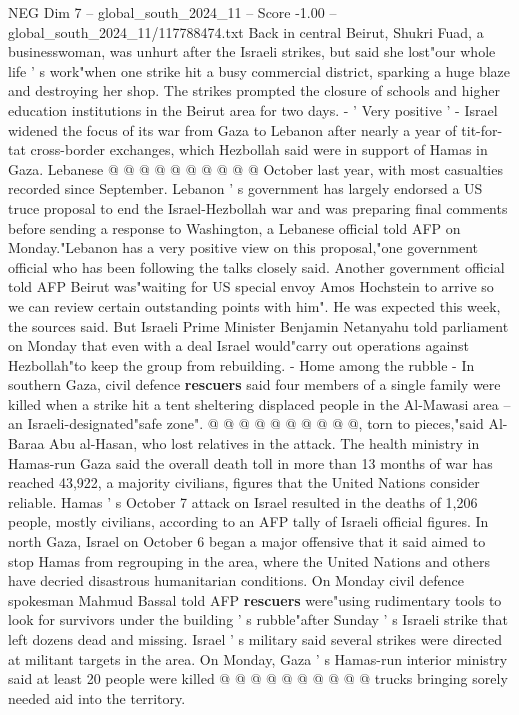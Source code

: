 \begin{textsample}{NEG Dim 7 – global\_south\_2024\_11 – Score -1.00 – global\_south\_2024\_11/117788474.txt}
Back in central Beirut, Shukri Fuad, a businesswoman, was unhurt after the Israeli strikes, but said she lost"our whole life ' s work"when one strike hit a busy commercial district, sparking a huge blaze and destroying her shop.
The strikes prompted the closure of schools and higher education institutions in the Beirut area for two days. - ' Very positive ' - Israel widened the focus of its war from Gaza to Lebanon after nearly a year of tit-for-tat cross-border exchanges, which Hezbollah said were in support of Hamas in Gaza.
Lebanese @ @ @ @ @ @ @ @ @ @ October last year, with most casualties recorded since September.
Lebanon ' s government has largely endorsed a US truce proposal to end the Israel-Hezbollah war and was preparing final comments before sending a response to Washington, a Lebanese official told AFP on Monday."Lebanon has a very positive view on this proposal,"one government official who has been following the talks closely said.
Another government official told AFP Beirut was"waiting for US special envoy Amos Hochstein to arrive so we can review certain outstanding points with him".
He was expected this week, the sources said.
But Israeli Prime Minister Benjamin Netanyahu told parliament on Monday that even with a deal Israel would"carry out operations against Hezbollah"to keep the group from rebuilding. - Home among the rubble - In southern Gaza, civil defence \textbf{rescuers} said four members of a single family were killed when a strike hit a tent sheltering displaced people in the Al-Mawasi area -- an Israeli-designated"safe zone". @ @ @ @ @ @ @ @ @ @, torn to pieces,"said Al-Baraa Abu al-Hasan, who lost relatives in the attack.
The health ministry in Hamas-run Gaza said the overall death toll in more than 13 months of war has reached 43,922, a majority civilians, figures that the United Nations consider reliable.
Hamas ' s October 7 attack on Israel resulted in the deaths of 1,206 people, mostly civilians, according to an AFP tally of Israeli official figures.
In north Gaza, Israel on October 6 began a major offensive that it said aimed to stop Hamas from regrouping in the area, where the United Nations and others have decried disastrous humanitarian conditions.
On Monday civil defence spokesman Mahmud Bassal told AFP \textbf{rescuers} were"using rudimentary tools to look for survivors under the building ' s rubble"after Sunday ' s Israeli strike that left dozens dead and missing.
Israel ' s military said several strikes were directed at militant targets in the area.
On Monday, Gaza ' s Hamas-run interior ministry said at least 20 people were killed @ @ @ @ @ @ @ @ @ @ trucks bringing sorely needed aid into the territory.

\end{textsample}
